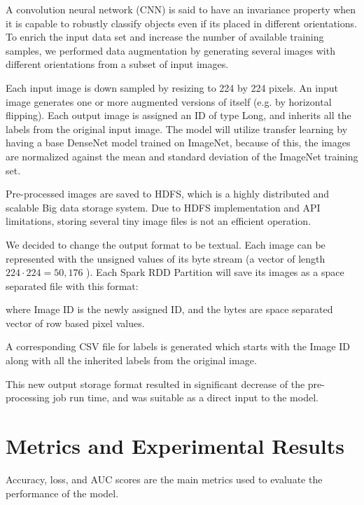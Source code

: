 \documentclass{amia}
\begin{document}
A convolution neural network (CNN) is said to have an invariance property when it is capable to robustly classify objects even if its placed in different orientations. To enrich the input data set and increase the number of available training samples, we performed data augmentation by generating several images with different orientations from a subset of input images.

Each input image is down sampled by resizing to 224 by 224 pixels. An input image generates one or more augmented versions of itself (e.g. by horizontal flipping). Each output image is assigned an ID of type Long, and inherits all the labels from the original input image. The model will utilize transfer learning by having a base DenseNet model trained on ImageNet, because of this, the images are normalized against the mean and standard deviation of the ImageNet training set.

Pre-processed images are saved to HDFS, which is a highly distributed and scalable Big data storage system. Due to HDFS implementation and API limitations, storing several tiny image files is not an efficient operation.

We decided to change the output format to be textual. Each image can be represented with the unsigned values of its byte stream (a vector of length $224\cdot224=50,176$ ). Each Spark RDD Partition will save its images as a space separated file with this format:


where Image ID is the newly assigned ID, and the bytes are space separated vector of row based pixel values.

A corresponding CSV file for labels is generated which starts with the Image ID along with all the inherited labels from the original image.

This new output storage format resulted in significant decrease of the pre-processing job run time, and was suitable as a direct input to the model.



\section*{Metrics and Experimental Results}
Accuracy, loss, and AUC scores are the main metrics used to evaluate the performance of the model.
\end{document}
